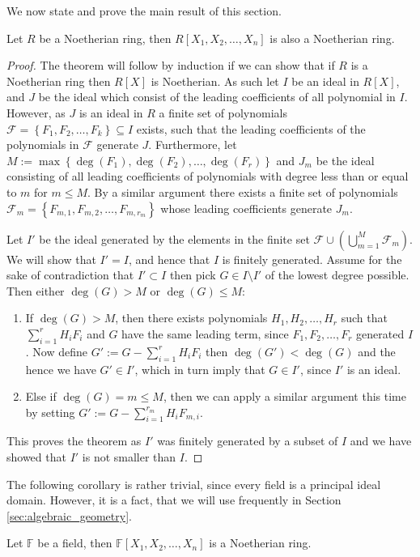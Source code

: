We now state and prove the main result of this section.
\begin{theorem}\label{thm:hbt}
  Let $R$ be a Noetherian ring, then $R[X_1, X_2, \ldots, X_{n}]$ is also a Noetherian ring.
\end{theorem}
\begin{proof}
  The theorem will follow by induction if we can show that if $R$ is a Noetherian ring then $R[X]$ is Noetherian. As such let $I$ be an ideal in $R[X]$, and $J$ be the ideal which consist of the leading coefficients of all polynomial in $I$. However, as $J$ is an ideal in $R$ a finite set of polynomials $\mathcal{F} = \left\{F_1, F_2, \ldots, F_{k}\right\} \subseteq I$ exists, such that the leading coefficients of the polynomials in $\mathcal{F}$ generate $J$. Furthermore, let $M := \max \left\{\deg(F_{1}), \deg(F_{2}), \ldots, \deg(F_{r}) \right\}$ and $J_m$ be the ideal consisting of all leading coefficients of polynomials with degree less than or equal to $m$ for $m \leq M$. By a similar argument there exists a finite set of polynomials $\mathcal{F}_{m} = \left\{F_{m, 1}, F_{m, 2}, \ldots, F_{m, r_{m}}\right\}$ whose leading coefficients generate $J_{m}$.

  Let $I'$ be the ideal generated by the elements in the finite set $\mathcal{F} \cup (\bigcup_{m = 1}^{M} \mathcal{F}_{m})$. We will show that $I' = I$, and hence that $I$ is finitely generated. Assume for the sake of contradiction that $I' \subset I$ then pick $G \in I \setminus I'$ of the lowest degree possible. Then either $\deg(G) > M$ or $\deg(G) \leq M$:
  \begin{enumerate}
    \item If $\deg(G) > M$, then there exists polynomials $H_1, H_2, \ldots, H_{r}$ such that $\sum_{i = 1}^{r} H_{i}F_{i}$ and $G$ have the same leading term, since $F_1, F_2, \ldots, F_{r}$ generated $I$. Now define $G' := G - \sum_{i = 1}^r H_{i}F_{i}$ then $\deg(G') < \deg(G)$ and the hence we have $G' \in I'$, which in turn imply that $G \in I'$, since $I'$ is an ideal.
    \item Else if $\deg(G) = m \leq M$, then we can apply a similar argument this time by setting $G' := G - \sum_{i = 1}^{r_{m}}H_{i} F_{m, i}$.
  \end{enumerate}
  This proves the theorem as $I'$ was finitely generated by a subset of $I$ and we have showed that $I'$ is not smaller than $I$.
\end{proof}
The following corollary is rather trivial, since every field is a principal ideal domain. However, it is a fact, that we will use frequently in Section \ref{sec:algebraic_geometry}.
\begin{corollary}\label{cor:pols_noetherian}
  Let $\mathbb{F}$ be a field, then $\mathbb{F}[X_1, X_2, \ldots, X_{n}]$ is a Noetherian ring.
\end{corollary}

